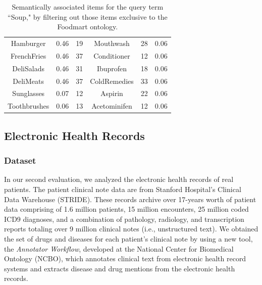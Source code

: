 \begin{table}[tbh]
\begin{center}
\begin{tabular}{ | c c c | c c c }
Hamburger	&	0.46	&	19	&	Mouthwash	&	28	 &	0.06	 \\
FrenchFries	&	0.46	&	37	&	Conditioner	&	12	 &	0.06	 \\
DeliSalads	&	0.46	&	31	&	Ibuprofen	&	18	&	0.06	 \\
DeliMeats	&	0.46	&	37	&	ColdRemedies	&	33	&	0.06	 \\
Sunglasses	&	0.07	&	12	&	Aspirin	&	22	&	0.06	 \\
Toothbrushes	&	0.06	&	13	&	Acetominifen	&	12	 &	0.06	 \\
\hline
\end{tabular}
\end{center}
\caption[Top results on the Foodmart dataset excluding concepts only in\protect\newline the ontology]{\label{tbl:foodmart_comp2} Semantically associated items  for the query term ``Soup," by filtering out those items exclusive to the Foodmart ontology.}
\end{table}


\subsection{Electronic Health Records}
\subsubsection{Dataset}
In our second evaluation, we analyzed the electronic health records of real patients. The patient clinical note data are from Stanford Hospital's Clinical Data Warehouse (STRIDE). These records archive over 17-years worth of patient data comprising of 1.6 million patients, 15 million encounters, 25 million coded ICD9 diagnoses, and a combination of pathology, radiology, and transcription reports totaling over 9 million clinical notes (i.e., unstructured text).
We obtained the set of drugs and diseases for each patient's clinical note by using a new tool, the \emph{Annotator Workflow}, developed at the National Center for Biomedical Ontology (NCBO), which annotates clinical text from electronic health record systems and extracts disease and drug mentions from the electronic health records.


